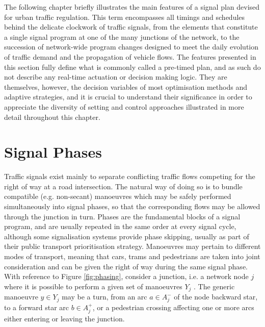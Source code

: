 The following chapter briefly illustrates the main features of a signal plan devised for urban traffic regulation.
This term encompasses all timings and schedules behind the delicate clockwork of traffic signals, from the elements that constitute a single signal program at one of the many junctions of the network, to the succession of network-wide program changes designed to meet the daily evolution of traffic demand and the propagation of vehicle flows.
The features presented in this section fully define what is commonly called a pre-timed plan, and as such do not describe any real-time actuation or decision making logic.
They are themselves, however, the decision variables of most optimisation methods and adaptive strategies, and it is crucial to understand their significance in order to appreciate the diversity of setting and control approaches illustrated in more detail throughout this chapter.


\section{Signal Phases}
Traffic signals exist mainly to separate conflicting traffic flows competing for the right of way at a road intersection. The natural way of doing so is to bundle compatible (e.g. non-secant) manoeuvres which may be safely performed simultaneously into signal phases, so that the corresponding flows may be allowed through the junction in turn. 
Phases are the fundamental blocks of a signal program, and are usually repeated in the same order at every signal cycle, although some signalisation systems provide phase skipping, usually as part of their public transport prioritisation strategy.
Manoeuvres may pertain to different modes of transport, meaning that cars, trams and pedestrians are taken into joint consideration and can be given the right of way during the same signal phase.
With reference to Figure \ref{fig:phasing}, consider a junction, i.e. a network node $j$ where it is possible to perform a given set of manoeuvres $Y_j$ . The generic manoeuvre $y \in Y_j$ may be a turn, from an arc $a \in A^{-}_{j}$ of the node backward star, to a forward star arc $b \in A^{+}_{j}$, or a pedestrian crossing affecting one or more arcs either entering or leaving the junction.

